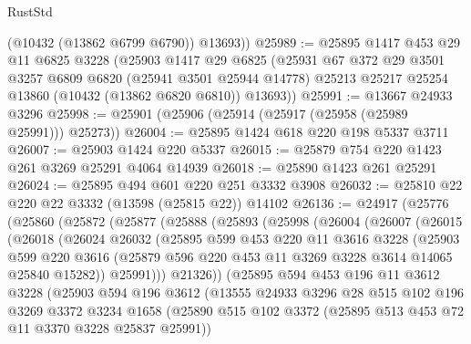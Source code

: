 \begin{lexlean}{RustStd}
\begin{coremodule}
        (@10432 (@13862 @6799 @6790))
        @13693))
@25989 := @25895
    @1417
    @453
    @29
    @11
    @6825
    @3228
    (@25903
      @1417
      @29
      @6825
      (@25931
        @67
        @372
        @29
        @3501
        @3257
        @6809
        @6820
        (@25941 @3501 @25944 @14778)
        @25213
        @25217
        @25254
        @13860
        (@10432 (@13862 @6820 @6810))
        @13693))
@25991 := @13667 @24933 @3296
@25998 := @25901 (@25906 (@25914 (@25917 (@25958 (@25989 @25991))) @25273))
@26004 := @25895 @1424 @618 @220 @198 @5337 @3711
@26007 := @25903 @1424 @220 @5337
@26015 := @25879 @754 @220 @1423 @261 @3269 @25291 @4064 @14939
@26018 := @25890 @1423 @261 @25291
@26024 := @25895 @494 @601 @220 @251 @3332 @3908
@26032 := @25810 @22 @220 @22 @3332 (@13598 (@25815 @22)) @14102
@26136 := @24917
    (@25776
      (@25860
        (@25872
          (@25877
            (@25888
              (@25893
                (@25998
                  (@26004
                    (@26007
                      (@26015
                        (@26018
                          (@26024
                            @26032
                            (@25895
                              @599
                              @453
                              @220
                              @11
                              @3616
                              @3228
                              (@25903
                                @599
                                @220
                                @3616
                                (@25879 @596 @220 @453 @11 @3269 @3228 @3614 @14065 @25840 @15282))
                              @25991)))
                        @21326))
                    (@25895
                      @594
                      @453
                      @196
                      @11
                      @3612
                      @3228
                      (@25903
                        @594
                        @196
                        @3612
                        (@13555
                          @24933
                          @3296
                          @28
                          @515
                          @102
                          @196
                          @3269
                          @3372
                          @3234
                          @1658
                          (@25890
                            @515
                            @102
                            @3372
                            (@25895 @513 @453 @72 @11 @3370 @3228 @25837 @25991))

\end{coremodule}
\end{lexlean}
